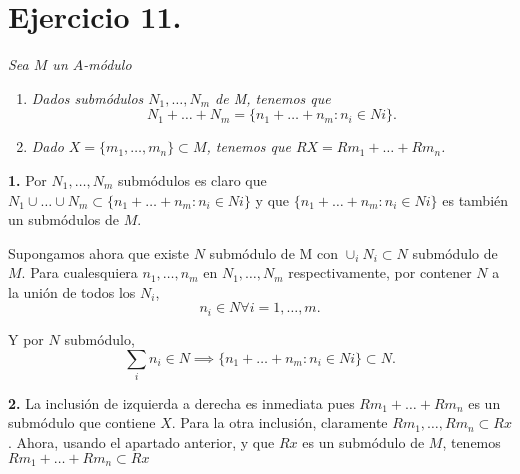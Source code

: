 \section{Ejercicio 11.}  \textit{Sea $M$ un $A$-módulo}\\
\begin{enumerate}
    \item \textit{Dados submódulos $N_1, \dots, N_m$ de M, tenemos que}
    \[
    N_1 + \dots + N_m = \{n_1 + \dots + n_m: n_i \in Ni\}
    .\]
    \item \textit{Dado $X = \{m_1, \dots, m_n\} \subset M$, tenemos que $RX = Rm_1 + \dots + Rm_n$.}
\end{enumerate}

\textbf{1.} Por $ N_1, \dots, N_m$ submódulos es claro que $N_1 \cup \dots \cup N_m \subset \{n_1 + \dots + n_m: n_i \in Ni\}$ y que $\{n_1 + \dots + n_m: n_i \in Ni\}$ es también un submódulos de $M$.

Supongamos ahora que existe $N$ submódulo de M con $ \cup_i N_i \subset N $ submódulo de $M$. Para cualesquiera $n_1, \dots, n_m$ en $ N_1, \dots, N_m$ respectivamente, por contener $N$ a la unión de todos los $N_i$,
\[
n_i \in N \forall i = 1, \dots, m
.\]

Y por $N$ submódulo,
\[
\sum_i n_i \in N \implies \{n_1 + \dots + n_m: n_i \in Ni\} \subset N
.\]

\textbf{2.} La inclusión de izquierda a derecha es inmediata pues $Rm_1 + \dots + Rm_n$ es un submódulo que contiene $X$. Para la otra inclusión, claramente $Rm_1, \dots, Rm_n \subset Rx$. Ahora, usando el apartado anterior, y que $Rx$ es un submódulo de $M$, tenemos $Rm_1 + \dots + Rm_n \subset Rx$
